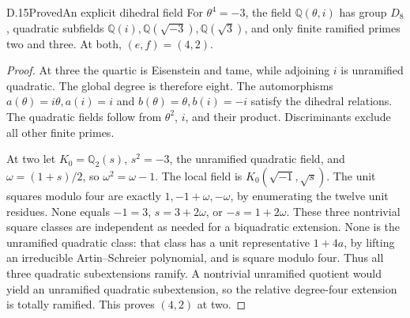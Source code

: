 \begin{statement}{D.15}{Proved}{An explicit dihedral field}
For $\theta^4=-3$, the field $\mathbb Q(\theta,i)$ has group
$D_8$, quadratic subfields
$\mathbb Q(i),\mathbb Q(\sqrt{-3}),\mathbb Q(\sqrt3)$,
and only finite ramified primes two and three.
At both, $(e,f)=(4,2)$.
\end{statement}
\begin{proof}
At three the quartic is Eisenstein and tame, while adjoining
$i$ is unramified quadratic. The global degree is therefore
eight. The automorphisms
$a(\theta)=i\theta,a(i)=i$ and
$b(\theta)=\theta,b(i)=-i$ satisfy the dihedral relations.
The quadratic fields follow from $\theta^2$, $i$, and their
product. Discriminants exclude all other finite primes.

At two let $K_0=\mathbb Q_2(s)$, $s^2=-3$, the unramified
quadratic field, and $\omega=(1+s)/2$, so $\omega^2=\omega-1$.
The local field is $K_0(\sqrt{-1},\sqrt{s})$.
The unit squares modulo four are exactly
$1,-1+\omega,-\omega$, by enumerating the twelve unit residues.
None equals $-1=3$, $s=3+2\omega$, or $-s=1+2\omega$.
These three nontrivial square classes are independent as
needed for a biquadratic extension.
None is the unramified quadratic class: that class has
a unit representative $1+4a$, by lifting an irreducible
Artin--Schreier polynomial, and is square modulo four.
Thus all three quadratic subextensions ramify.
A nontrivial unramified quotient would yield an unramified
quadratic subextension, so the relative degree-four
extension is totally ramified. This proves $(4,2)$ at two.
\end{proof}

